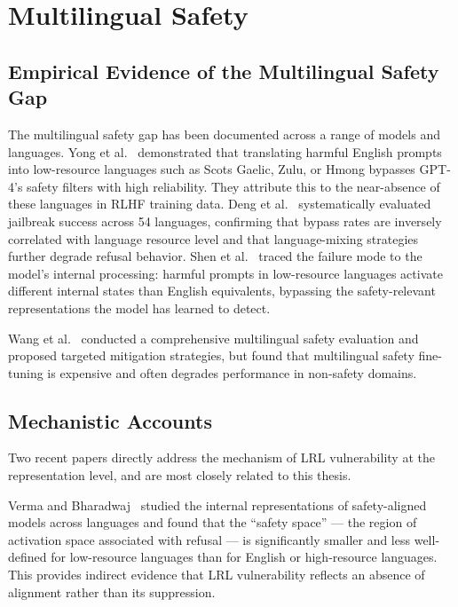 \section{Multilingual Safety}
\label{sec:multilingual}

\subsection{Empirical Evidence of the Multilingual Safety Gap}

The multilingual safety gap has been documented across a range of models and languages. Yong et al.~\citeyearpar{yong2023low} demonstrated that translating harmful English prompts into low-resource languages such as Scots Gaelic, Zulu, or Hmong bypasses GPT-4's safety filters with high reliability. They attribute this to the near-absence of these languages in RLHF training data. Deng et al.~\citeyearpar{deng2024multilingual} systematically evaluated jailbreak success across 54 languages, confirming that bypass rates are inversely correlated with language resource level and that language-mixing strategies further degrade refusal behavior. Shen et al.~\citeyearpar{shen2024language} traced the failure mode to the model's internal processing: harmful prompts in low-resource languages activate different internal states than English equivalents, bypassing the safety-relevant representations the model has learned to detect.

Wang et al.~\citeyearpar{wang2024all} conducted a comprehensive multilingual safety evaluation and proposed targeted mitigation strategies, but found that multilingual safety fine-tuning is expensive and often degrades performance in non-safety domains.

\subsection{Mechanistic Accounts}

Two recent papers directly address the mechanism of LRL vulnerability at the representation level, and are most closely related to this thesis.

Verma and Bharadwaj~\citeyearpar{verma2025hidden} studied the internal representations of safety-aligned models across languages and found that the ``safety space'' — the region of activation space associated with refusal — is significantly smaller and less well-defined for low-resource languages than for English or high-resource languages. This provides indirect evidence that LRL vulnerability reflects an absence of alignment rather than its suppression.

